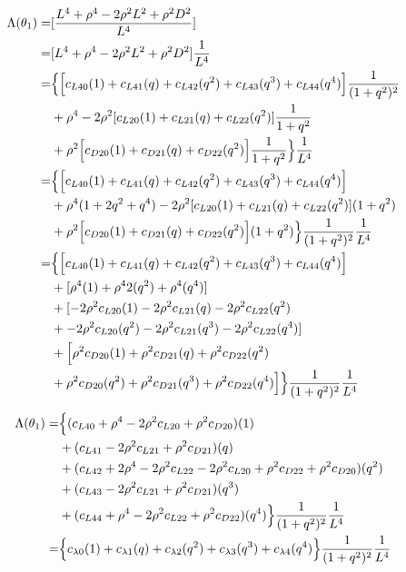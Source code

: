 \documentclass[12pt]{article}
\begin{document}
\begin{align}
    \Lambda(\theta_1) =& [ \frac{L^4 + \rho^4 -2\rho^2L^2 + \rho^2D^2}{L^4}]\\
    =& [ L^4 + \rho^4 -2\rho^2L^2 + \rho^2D^2]\frac{1}{L^4}\\
    =& \Bigl\{ \Bigl[ c_{L40}(1) +  c_{L41}(q) + c_{L42}(q^2) + c_{L43}(q^3) + c_{L44}(q^4) \Bigr]\frac{1}{(1+q^2)^2} \nonumber\\
    &+ \rho^4 -2\rho^2[ c_{L20}(1) + c_{L21}(q)  + c_{L22}(q^2)]\frac{1}{1+q^2} \nonumber\\
    &+ \rho^2\Bigl[ c_{D20}(1) + c_{D21}(q) + c_{D22}(q^2)\Bigr]\frac{1}{1+q^2}  \Bigr\}\frac{1}{L^4}\\
    =& \Bigl\{ \Bigl[ c_{L40}(1) +  c_{L41}(q) + c_{L42}(q^2) + c_{L43}(q^3) + c_{L44}(q^4) \Bigr] \nonumber\\
    &+ \rho^4(1+2q^2 + q^4) -2\rho^2[ c_{L20}(1) + c_{L21}(q)  + c_{L22}(q^2)](1+q^2) \nonumber\\
    &+ \rho^2\Bigl[ c_{D20}(1) + c_{D21}(q) + c_{D22}(q^2)\Bigr](1+q^2)  \Bigr\}\frac{1}{(1+q^2)^2}\frac{1}{L^4}\\
    =& \Bigl\{ \Bigl[ c_{L40}(1) +  c_{L41}(q) + c_{L42}(q^2) + c_{L43}(q^3) + c_{L44}(q^4) \Bigr] \nonumber\\
    &+ [\rho^4(1)+ \rho^42(q^2) + \rho^4(q^4)] \nonumber\\
    &+ [ -2\rho^2c_{L20}(1) -2\rho^2c_{L21}(q)  -2\rho^2c_{L22}(q^2) \nonumber\\
    &+ -2\rho^2c_{L20}(q^2) -2\rho^2c_{L21}(q^3)  -2\rho^2c_{L22}(q^4)] \nonumber\\
    &+ \Bigl[ \rho^2c_{D20}(1) + \rho^2c_{D21}(q) + \rho^2c_{D22}(q^2) \nonumber\\
    &+ \rho^2c_{D20}(q^2) + \rho^2c_{D21}(q^3) + \rho^2c_{D22}(q^4) \Bigr]  \Bigr\}\frac{1}{(1+q^2)^2}\frac{1}{L^4}\\
\end{align}

\begin{align}
    \Lambda(\theta_1)
    =& \Bigl\{ ( c_{L40} + \rho^4 -2\rho^2c_{L20} + \rho^2c_{D20})(1)\nonumber\\
    &+ (c_{L41} -2\rho^2c_{L21} + \rho^2c_{D21})(q)\nonumber\\
    &+(c_{L42} + 2\rho^4 -2\rho^2c_{L22} -2\rho^2c_{L20} + \rho^2c_{D22} + \rho^2c_{D20})(q^2)\nonumber\\
    &+(c_{L43} -2\rho^2c_{L21} + \rho^2c_{D21} )(q^3)\nonumber\\
    &+( c_{L44} + \rho^4 -2\rho^2c_{L22} +  \rho^2c_{D22} )(q^4)
    \Bigr\}\frac{1}{(1+q^2)^2}\frac{1}{L^4}\\
    =& \Bigl\{ c_{\lambda0}(1) + c_{\lambda1}(q) +c_{\lambda2}(q^2) +c_{\lambda3}(q^3) +c_{\lambda4}(q^4)
    \Bigr\}\frac{1}{(1+q^2)^2}\frac{1}{L^4}\\
\end{align}
\end{document}
